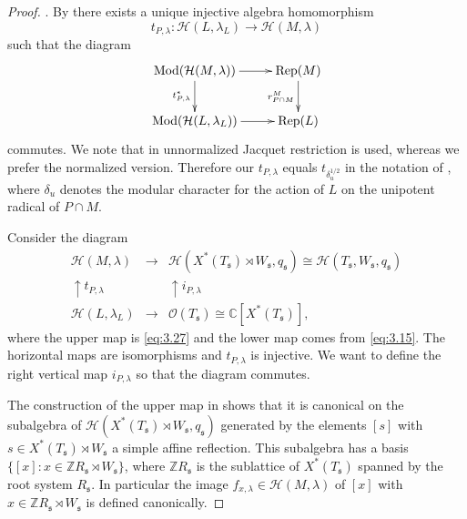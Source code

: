 \documentclass[11pt]{amsart}
\theoremstyle{definition}
\begin{document}
\begin{proof}
\cite[\S 7]{BuKu3}. By \cite[Corollaries 7.2 and 7.11]{BuKu3} 
there exists a unique injective algebra homomorphism \label{i:57}
\begin{equation}\label{eq:3.21}
t_{P,\lambda} : {{\mathcal H}} (L,\lambda_L) \to {{\mathcal H}} (M,\lambda) 
\end{equation}
such that the diagram
\[
\xymatrix{
{{\rm Mod}} ({{\mathcal H}} (M,\lambda)) \ar[r] \ar[d]_{t_{P,\lambda}^*} & {{\rm Rep}} (M) \ar[d]_{r^M_{P \cap M}} \\
{{\rm Mod}} ({{\mathcal H}} (L,\lambda_L)) \ar[r] & {{\rm Rep}} (L)
}
\]
commutes. We note
that in \cite{BuKu3} unnormalized Jacquet restriction is used, whereas we prefer 
the normalized version. Therefore our $t_{P,\lambda}$ equals $t_{\delta_u^{1/2}}$
in the notation of \cite[\S 7]{BuKu3}, where $\delta_u$ denotes the modular character 
for the action of $L$ on the unipotent radical of $P \cap M$.

Consider the diagram 
\begin{equation}\label{eq:3.23}
\begin{array}{ccc}
{{\mathcal H}} (M,\lambda) & \to & {{\mathcal H}} (X^* (T_{{\mathfrak s}}) \rtimes W_{{\mathfrak s}} ,q_{{\mathfrak s}}) \cong 
{{\mathcal H}} (T_{{\mathfrak s}}, W_{{\mathfrak s}} ,q_{{\mathfrak s}}) \\
 \uparrow {\scriptstyle t_{P,\lambda}} & & \uparrow \scriptstyle{i_{P,\lambda}} \\
{{\mathcal H}} (L,\lambda_L) & \to & \mathcal O (T_{{\mathfrak s}}) \cong {\mathbb C} [X^* (T_{{\mathfrak s}})] ,
\end{array}
\end{equation}
where the upper map is \eqref{eq:3.27} and the lower map comes from \eqref{eq:3.15}. 
The horizontal maps are isomorphisms and $t_{P,\lambda}$ is injective. We want to define 
the right vertical map $i_{P,\lambda}$ so that the diagram commutes.

The construction of the upper map in \cite[\S 4]{Sec3} shows that it is canonical on 
the subalgebra of ${{\mathcal H}} (X^* (T_{{\mathfrak s}}) \rtimes W_{{\mathfrak s}} ,q_{{\mathfrak s}})$ generated by the elements
$[s]$ with $s \in X^* (T_{{\mathfrak s}}) \rtimes W_{{\mathfrak s}}$ a simple affine reflection. This 
subalgebra has a basis $\{ [x] : x \in {\mathbb Z} R_{{\mathfrak s}} \rtimes W_{{\mathfrak s}} \}$, where ${\mathbb Z} R_{{\mathfrak s}}$ 
is the sublattice of $X^* (T_{{\mathfrak s}})$ spanned by the root system $R_{{\mathfrak s}}$. In particular
the image $f_{x,\lambda} \in {{\mathcal H}} (M,\lambda)$ of $[x]$ with $x \in {\mathbb Z} R_{{\mathfrak s}} \rtimes W_{{\mathfrak s}}$
is defined canonically.


\end{proof}
\end{document}
